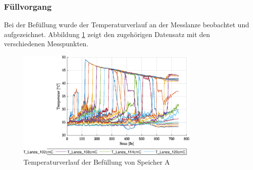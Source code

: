 \subsubsection{Füllvorgang}
Bei der Befüllung wurde der Temperaturverlauf an der Messlanze beobachtet und aufgezeichnet. Abbildung \ref{fig:SpAfill} zeigt den zugehörigen Datensatz mit den verschiedenen Messpunkten.

\begin{figure}[H]
	\centering
	\includegraphics[width=0.8\textwidth]{../DATA/SpA_Lanzen.eps}
	\caption[Temperaturverlauf Speicher A]{Temperaturverlauf der Befüllung von Speicher A}
	\label{fig:SpAfill}
\end{figure}

